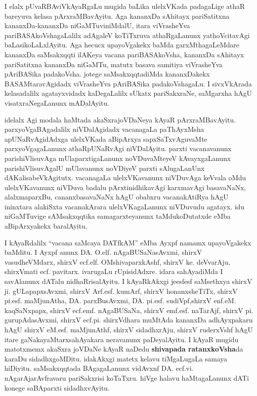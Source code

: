 \medskip

I elalx pUvaRBAviVkAyaRgaLu mugida baLika ulelxVKada padagaLige athaR bareyuva kelasa pArxraMBavAyitu. Aga kananxDa sAhitayx pariSatitxna kananxDa-kananxDa niGaMTuviniMdalU, itara viVrasheYva pariBASAkoVshagaLalilx adAgaleV koTiTxruva athaRgaLanunx yathoVcitavAgi baLasikoLaLxlAyitu. Aga hecucx upayoVgakekx baMda garxMthagaLeMdare kananxDa saMsakxqqti ilAKeya vacana pariBASA\-koVsha, kananxDa sAhitayx pariSatitxna kananxDa niGaMTu, matutx basava samitiya viVrasheYva pAri\-BASika padakoVsha. jotege saMsakxqqtadiMda kananxDakekx BASAMtaravAgidadx viVrasheYva pAriBASika padakoVshagaLu. I sivxVkArada kelasadalilx agatayxvidadx kaDegaLalilx sUkatx pariSakxraNe, saMgarxha hAgU visatxraNegaLanunx mADalAyitu.

\medskip

idelalx Agi modala haMtada akaSxrajoVDaNeya kAyaR pArxraMBavAyitu. parxyoVgaBAgadalilx niVDalAgidadx vacanagaLa paThAyxMsha apUNaRvAgidAdxga ulelxVKada aBipArxya sapxSaTxvAguvaMte parxyoVgagaLanunx athaRpUNaRvAgi niVDalAyitu. parxti vacanavanunx parishiVlisuvAga mUlaparxtigaLanunx noVDuvaMteyeV kAvayxgaLanunx parishiVlisuvAgalU mUlavanunx noVDiyeV parxti sAlugaLanUnx dAKalisabeVkAgitutx. vacanagaLa ulelxVKavanunx niVDuvAga keVvala oMdu ulelxVKavanunx niVDuva badalu  pArxtinidhikavAgi karxmavAgi basavaNaNx, alalxmaparxBu, cananxbasavaNaNx hAgU obabxru vacanakAtiRya hAgU ininxtara alakiSxta vacanakArara ulelxVKagaLanunx niVDuvudu agatayx. idu niGaMTuvige sAMsakxqqtika samagarxteyanunx taMdukoDutatxde eMba aBipArxyakekx baralAyitu.

\medskip

I kAyaRdalilx ``vacana saMcaya DATfkAM'' eMba  Ayxpf namamx upayoVgakekx baMditu. I Ayxpf anunx DA. O.elf. nAgaBUSaNa\-sAvxmi, shirxV vasudheVMdarx, shirxV ecf.elf. OMshivaparxkAshf, shirxV ke. deVvarAju, shirxVmati ecf. pavitarx.  ivaru\-gaLu rUpisidAdxre.  idara sahAyadiMda I savAlanunx dATalu nidhaRrisalAyitu. I kAyaRkAkxgi jeesfesf saMsethxya shirxV ji. gULapapxsAvxmi, shirxV Arf.esf. kumArf, shirxV honanxsheTiTx, shirxV pi.esf. maMjunAtha, DA. parxBusAvxmi, DA. pi.esf. sudiVpf,\break shirxV enf.eM. kaqSaNxpapx, shirxV ecf.emf. nAgaBUSaNa, shirxV emf.esf. naTarAjf, shirxV pi. gurupAdasAvxmi, shirxV ecf.pi. \hbox{shirxVdhara} muMtAda kananxDa adhAyxpakaru hAgU shirxV eM.esf. maMjunAthf, shirxV sidadhxrAju, shirxV ruderxVshf hAgU itare gaNakayaMtarx\break sahAyakara neravanunx paDeyalAyitu. I kAyaR mugidu matotxmemx akaSxra joVDaNe kAyaR naDedu \textbf{shivapada ratanxkoVsha}da karaDu sidadhxgoMDitu. idakAkxgi matetx kelavu tiMgaLugaLa samaya hiDiyitu. saMsakxqqtada BAgagaLanunx vidAvxnf DA. ecf.vi. nAgarAja\-rAvfravaru pariSakxrisi koTaTxru. hiVge halavu haMtagaLanunx dATi konege saBAparxti sidadhxvAyitu.

